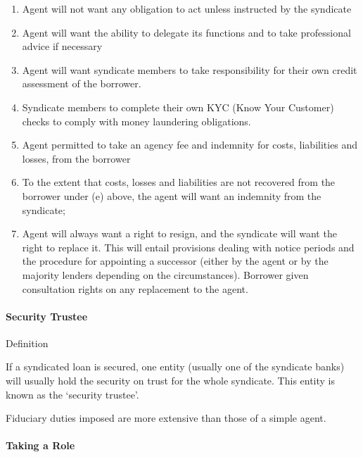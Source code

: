 \documentclass[
]{article}
\providecommand{\tightlist}{%
  \setlength{\itemsep}{0pt}\setlength{\parskip}{0pt}}
\newenvironment{env-f09e27d9-67b8-4931-ab1f-ca6031966775}
{
    \savenotes\tcolorbox[blanker,breakable,left=5pt,borderline west={2pt}{-4pt}{yellow}]
}
{
    \endtcolorbox\spewnotes
}
\begin{document}
\begin{enumerate}
\tightlist
\item
  Agent will not want any obligation to act unless instructed by the
  syndicate
\item
  Agent will want the ability to delegate its functions and to take
  professional advice if necessary
\item
  Agent will want syndicate members to take responsibility for their own
  credit assessment of the borrower.
\item
  Syndicate members to complete their own KYC (Know Your Customer)
  checks to comply with money laundering obligations.
\item
  Agent permitted to take an agency fee and indemnity for costs,
  liabilities and losses, from the borrower
\item
  To the extent that costs, losses and liabilities are not recovered
  from the borrower under (e) above, the agent will want an indemnity
  from the syndicate;
\item
  Agent will always want a right to resign, and the syndicate will want
  the right to replace it. This will entail provisions dealing with
  notice periods and the procedure for appointing a successor (either by
  the agent or by the majority lenders depending on the circumstances).
  Borrower given consultation rights on any replacement to the agent.
\end{enumerate}

\hypertarget{security-trustee}{%
\paragraph{Security Trustee}\label{security-trustee}}

\begin{env-f09e27d9-67b8-4931-ab1f-ca6031966775}

Definition

If a syndicated loan is secured, one entity (usually one of the
syndicate banks) will usually hold the security on trust for the whole
syndicate. This entity is known as the `security trustee'.

\end{env-f09e27d9-67b8-4931-ab1f-ca6031966775}

Fiduciary duties imposed are more extensive than those of a simple
agent.

\hypertarget{taking-a-role}{%
\paragraph{Taking a Role}\label{taking-a-role}}
\end{document}
